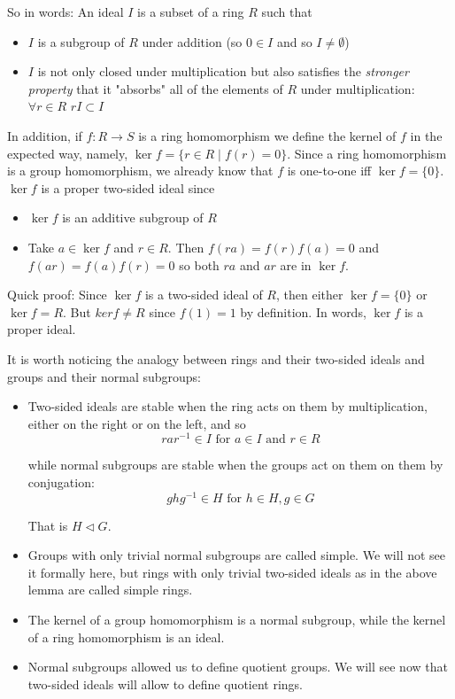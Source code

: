 \documentclass{article}
\theoremstyle{definition}
\begin{document}
\bigskip
\noindent
So in words: An ideal $I$ is a subset of a ring $R$ such that

\begin{itemize}
\item $I$ is a subgroup of $R$ under addition (so $0 \in I$ and
      so $I \neq \emptyset$)  
\item $I$ is not only closed under multiplication but also
      satisfies the \emph{stronger property} that it "absorbs"
      all of the elements of $R$ under multiplication: $\forall r
      \in R$ $rI \subset I$ 
\end{itemize}

\bigskip
\noindent
In addition, if $f : R \rightarrow S$ is a ring homomorphism we
define the kernel of $f$ in the expected way, namely, $\ker f =
\{r \in R \mid f(r) = 0\}$. Since a ring homomorphism is a group
homomorphism, we already know that $f$ is one-to-one iff $\ker f
= \{0\}$.  $\ker f$ is a proper two-sided ideal since

\begin{itemize}
\item $\ker f$ is an additive subgroup of $R$
\item Take $a \in \ker f$ and $r \in R$. Then $f(ra) = f(r)f(a) =
      0$ and $f(ar) = f(a)f(r) = 0$ so both $ra$ and $ar$ are in 
      $\ker f$. 
\end{itemize}

\noindent
Quick proof: Since $\ker f$ is a two-sided ideal of $R$, then
either $\ker f = \{0\}$ or $\ker f = R$.  But $ker f \neq R$
since $f(1) = 1 $ by definition. In words, $\ker f$ is a proper
ideal.

\bigskip
\noindent
It is worth noticing the analogy between rings and their
two-sided ideals and groups and their normal subgroups: 

\begin{itemize}
\item Two-sided ideals are stable when the ring acts on them by
      multiplication, either on the right or on the left, and so 
\begin{equation*}
rar^{-1} \in I \text{ for }a \in I \text{ and } r \in R
\end{equation*}

\noindent
while normal subgroups are stable when the groups act on them on
them by conjugation: 
\begin{equation*}
ghg^{-1} \in H \text{ for } h \in H, g \in G
\end{equation*}

\noindent
That is  $H \lhd G$.
\item Groups with only trivial normal subgroups are called
      simple. We will not see it formally here, but rings with
      only trivial two-sided ideals as in the above lemma are
      called simple rings.
\item The kernel of a group homomorphism is a normal subgroup,
      while the kernel of a ring homomorphism is an ideal. 
\item Normal subgroups allowed us to define quotient groups. We
      will see now that two-sided ideals will allow to define
      quotient rings. 
\end{itemize}
\end{document}

